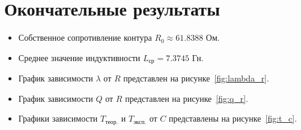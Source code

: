 \section{Окончательные результаты}
\begin{itemize}
\item Собственное сопротивление контура \(R_0 \approx 61.8388\) Ом.
\item Среднее значение индуктивности \(L_\text{ср} = 7.3745\) Гн.
\item График зависимости \(\lambda\) от \(R\) представлен
на рисунке~\ref{fig:lambda_r}.
\item График зависимости \(Q\) от \(R\) представлен на рисунке~\ref{fig:q_r}.
\item Графики зависимости \(T_\text{теор.}\) и \(T_\text{эксп.}\) от \(C\) представлены на рисунке~\ref{fig:t_c}.
\end{itemize}
